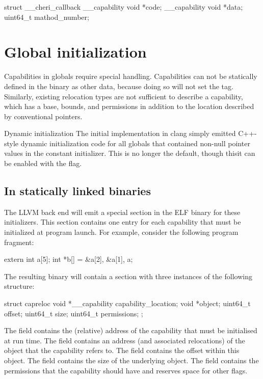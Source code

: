 \begin{csnippet}
struct __cheri_callback
{
	__capability void *code;
	__capability void *data;
	uint64_t           mathod_number;
}
\end{csnippet}

\section{Global initialization}
Capabilities in globals require special handling.
Capabilities can not be statically defined in the binary as other data, because doing so will not set the tag.
Similarly, existing relocation types are not sufficient to describe a capability, which has a base, bounds, and permissions in addition to the location described by conventional pointers.

\begin{notebox}{Dynamic initialization}
The initial implementation in clang simply emitted C++-style dynamic initialization code for all globals that contained non-null pointer values in the constant initializer.
This is no longer the default, though thisit can be enabled with the  flag.
\end{notebox}
\subsection{In statically linked binaries}

The LLVM back end will emit a special section in the ELF binary for these initializers.
This section contains one entry for each capability that must be initialized at program launch.
For example, consider the following program fragment:
\begin{csnippet}
extern int a[5];
int *b[] = {&a[2], &a[1], a};
\end{csnippet}

The resulting binary will contain a  section with three instances of the following structure:

\begin{csnippet}
struct capreloc
{
	void *__capability capability_location;
	void              *object;
	uint64_t           offset;
	uint64_t           size;
	uint64_t           permissions;
};
\end{csnippet}

The  field contains the (relative) address of the capability that must be initialised at run time.
The  field contains an address (and associated relocations) of the object that the capability refers to.
The  field contains the offset within this object.
The  field contains the size of the underlying object.
The  field contains the permissions that the capability should have and reserves space for other flags.

